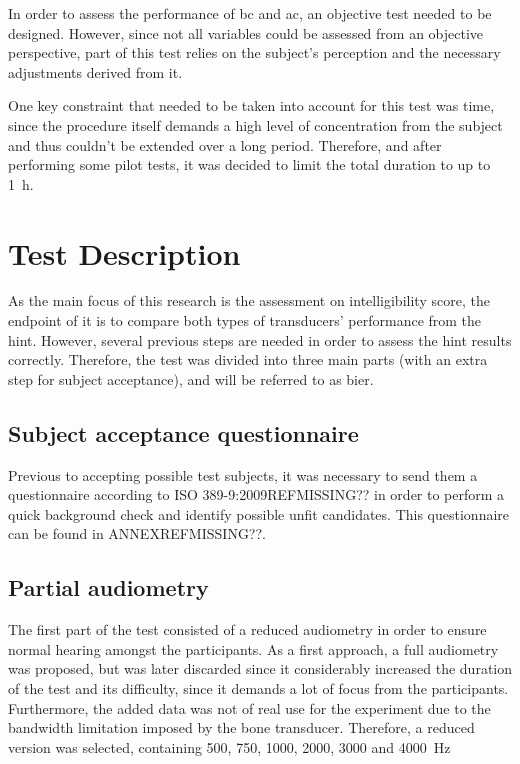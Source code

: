 In order to assess the performance of \gls{bc} and \gls{ac}, an objective test needed to be designed. However, since not all variables could be assessed from an objective perspective, part of this test relies on the subject's perception and the necessary adjustments derived from it.

One key constraint that needed to be taken into account for this test was time, since the procedure itself demands a high level of concentration from the subject and thus couldn't be extended over a long period. Therefore, and after performing some pilot tests, it was decided to limit the total duration to up to \SI{1}{\hour}.
\section{Test Description}
\label{sec:test_description}

As the main focus of this research is the assessment on intelligibility score, the endpoint of it is to compare both types of transducers' performance from the \gls{hint}. However, several previous steps are needed in order to assess the \gls{hint} results correctly. Therefore, the test was divided into three main parts (with an extra step for subject acceptance), and will be referred to as \gls{bier}.

\subsection{Subject acceptance questionnaire}
Previous to accepting possible test subjects, it was necessary to send them a questionnaire according to ISO 389-9:2009REFMISSING?? in order to perform a quick background check and identify possible unfit candidates.
This questionnaire can be found in ANNEXREFMISSING??.

\subsection{Partial audiometry}
The first part of the test consisted of a reduced audiometry in order to ensure normal hearing amongst the participants. As a first approach, a full audiometry was proposed, but was later discarded since it considerably increased the duration of the test and its difficulty, since it demands a lot of focus from the participants. Furthermore, the added data was not of real use for the experiment due to the bandwidth limitation imposed by the bone transducer.
Therefore, a reduced version was selected, containing 500, 750, 1000, 2000, 3000 and \SI{4000}{\hertz}


